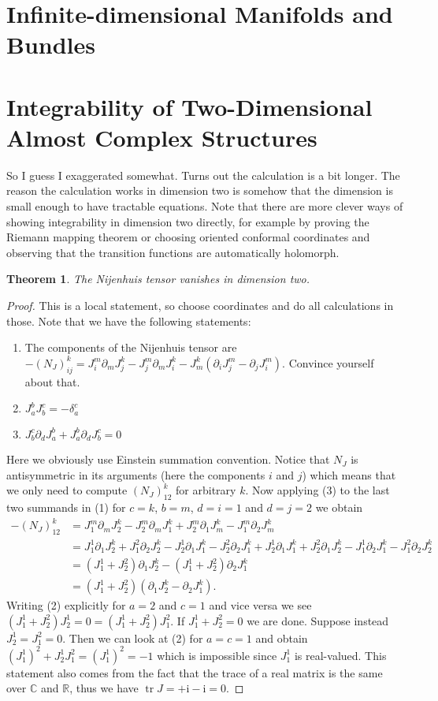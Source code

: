 \documentclass[a4paper]{article}
\newcommand{\RR}{\mathbb{R}}
\newcommand{\CC}{\mathbb{C}}
\newcommand{\ii}{\mathrm{i}}
\newcommand{\del}{\partial}
\newcommand{\tr}{\operatorname{tr}}
\newtheorem*{thm}{Theorem}
\theoremstyle{definition}
\theoremstyle{remark}
\theoremstyle{remark}
\begin{document}
\section*{Infinite-dimensional Manifolds and Bundles}

\section*{Integrability of Two-Dimensional Almost Complex Structures}

So I guess I exaggerated somewhat. Turns out the calculation is a bit longer. The reason the calculation works in dimension two is somehow that the dimension is small enough to have tractable equations. Note that there are more clever ways of showing integrability in dimension two directly, for example by proving the Riemann mapping theorem or choosing oriented conformal coordinates and observing that the transition functions are automatically holomorph.

\begin{thm}
  The Nijenhuis tensor vanishes in dimension two.
\end{thm}

\begin{proof}
  This is a local statement, so choose coordinates and do all calculations in those. Note that we have the following statements:
  \begin{enumerate}
  \item The components of the Nijenhuis tensor are $-(N_J)_{ij}^k=J_i^m\del_mJ_j^k-J_j^m\del_mJ_i^k-J_m^k(\del_iJ_j^m-\del_jJ_i^m)$. Convince yourself about that.
  \item $J_a^bJ_b^c=-\delta_a^c$
  \item $J_b^c\del_dJ_a^b+J_a^b\del_dJ_b^c=0$
  \end{enumerate}
Here we obviously use Einstein summation convention. Notice that $N_J$ is antisymmetric in its arguments (here the components $i$ and $j$) which means that we only need to compute $(N_J)_{12}^k$ for arbitrary $k$. Now applying (3) to the last two summands in (1) for $c=k$, $b=m$, $d=i=1$ and $d=j=2$ we obtain
\begin{align*}
  -(N_J)_{12}^k&=J_1^m\del_mJ_2^k-J_2^m\del_mJ_1^k+J_2^m\del_1J_m^k-J_1^m\del_2J_m^k\\
  &=J_1^1\del_1J_2^k+J_1^2\del_2J_2^k-J_2^1\del_1J_1^k-J_2^2\del_2J_1^k+J_2^1\del_1J_1^k+J_2^2\del_1J_2^k-J_1^1\del_2J_1^k-J_1^2\del_2J_2^k\\
  &=(J_1^1+J_2^2)\del_1J_2^k-(J_1^1+J_2^2)\del_2J_1^k\\
  &=(J_1^1+J_2^2)(\del_1J_2^k-\del_2J_1^k).
\end{align*}
Writing (2) explicitly for $a=2$ and $c=1$ and vice versa we see $(J^1_1+J_2^2)J_2^1=0=(J_1^1+J_2^2)J_1^2$. If $J_1^1+J_2^2=0$ we are done. Suppose instead $J_2^1=J_1^2=0$. Then we can look at (2) for $a=c=1$ and obtain $(J_1^1)^2+J_2^1J_1^2=(J_1^1)^2=-1$ which is impossible since $J_1^1$ is real-valued. This statement also comes from the fact that the trace of a real matrix is the same over $\CC$ and $\RR$, thus we have $\tr J=+\ii-\ii=0$.
\end{proof}
\end{document}
